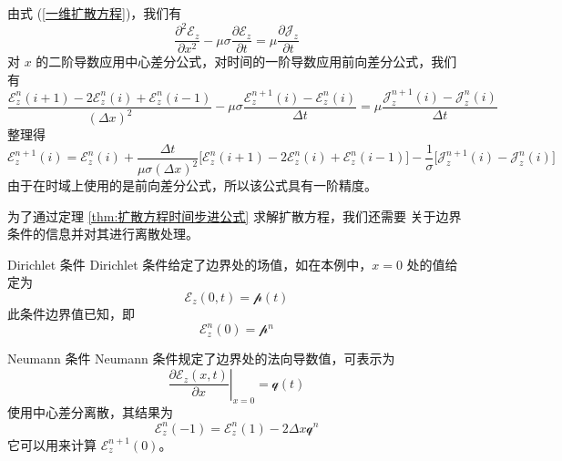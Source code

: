\begin{solution}
    由式 (\ref{一维扩散方程})，我们有
    \begin{equation*}
        \frac{\partial^2 \mathscr{E}_z}{\partial x^2}
        -\mu \sigma \frac{\partial \mathscr{E}_z}{\partial t}
        =\mu \frac{\partial \mathscr{J}_z}{\partial t}
    \end{equation*}
    对 $x$ 的二阶导数应用中心差分公式，对时间的一阶导数应用前向差分公式，我们有
    \begin{equation*}
        \frac{\mathscr{E}_z^{n}(i+1)-2\mathscr{E}_z^n(i)+\mathscr{E}_z^{n}(i-1)}{(\Delta x)^2}
        -\mu \sigma \frac{\mathscr{E}_z^{n+1}(i)-\mathscr{E}_z^n(i)}{\Delta t}
        =\mu \frac{\mathscr{J}_z^{n+1}(i)-\mathscr{J}_z^n(i)}{\Delta t}
    \end{equation*}
    整理得
    \begin{equation*}
        \mathscr{E}_z^{n+1}(i)=\mathscr{E}_z^n(i)
        +\frac{\Delta t}{\mu \sigma (\Delta x)^2}
        \Big[\mathscr{E}_z^n(i+1)-2\mathscr{E}_z^n(i)+\mathscr{E}_z^n(i-1)\Big]
        -\frac{1}{\sigma}\Big[\mathscr{J}_z^{n+1}(i)-\mathscr{J}_z^{n}(i)\Big]
    \end{equation*}
    由于在时域上使用的是前向差分公式，所以该公式具有一阶精度。
\end{solution}

\par 为了通过定理 \ref{thm:扩散方程时间步进公式} 求解扩散方程，我们还需要
关于边界条件的信息并对其进行离散处理。

\begin{theorem}{Dirichlet 条件}
    Dirichlet 条件给定了边界处的场值，如在本例中，$x=0$ 处的值给定为
    \begin{equation}
        \mathscr{E}_z(0,t)=\mathscr{p}(t)
    \end{equation}
    此条件边界值已知，即
    \begin{equation}
        \mathscr{E}_z^n(0)=\mathscr{p}^n
    \end{equation}
\end{theorem}

\begin{theorem}{Neumann 条件}
    Neumann 条件规定了边界处的法向导数值，可表示为
    \begin{equation}
        \left.\frac{\partial \mathscr{E}_z(x,t)}{\partial x}\right|_{x=0}
        =\mathscr{q}(t)
    \end{equation}
    使用中心差分离散，其结果为
    \begin{equation}
        \mathscr{E}_z^n(-1)=\mathscr{E}_z^n(1)-2\Delta x 
        \mathscr{q}^n
    \end{equation}
    它可以用来计算 $\mathscr{E}_z^{n+1}(0)$。
\end{theorem}

